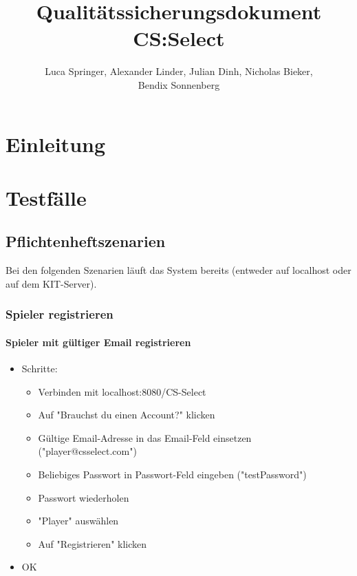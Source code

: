 \documentclass[a4paper]{scrreprt}
\begin{document}
    \title{Qualitätssicherungsdokument CS:Select}
    \author{Luca Springer, Alexander Linder, Julian Dinh, Nicholas Bieker,\\ Bendix Sonnenberg}
    \maketitle

    \tableofcontents
    \chapter{Einleitung}



    \chapter{Testfälle}
        \section{Pflichtenheftszenarien}
        Bei den folgenden Szenarien läuft das System bereits (entweder auf localhost oder auf dem KIT-Server). \\
            \subsection{Spieler registrieren}
            \subsubsection{Spieler mit gültiger Email registrieren}
            \begin{itemize}
                \item Schritte:
                    \begin{itemize}
                        \item Verbinden mit localhost:8080/CS-Select
                        \item Auf "Brauchst du einen Account?" klicken
                        \item Gültige Email-Adresse in das Email-Feld einsetzen ("player@csselect.com")
                        \item Beliebiges Passwort in Passwort-Feld eingeben ("testPassword")
                        \item Passwort wiederholen
                        \item "Player" auswählen
                        \item Auf "Registrieren" klicken
                    \end{itemize}
                \item OK %
            \end{itemize}
\end{document}
